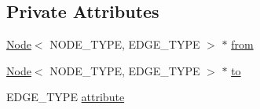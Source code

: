 \subsection*{Private Attributes}
\begin{DoxyCompactItemize}
\item 
\hyperlink{class_node}{Node}$<$ N\+O\+D\+E\+\_\+\+T\+Y\+P\+E, E\+D\+G\+E\+\_\+\+T\+Y\+P\+E $>$ $\ast$ \hyperlink{class_edge_a1bffa41df2941b7d55c59a5031f78e14}{from}
\item 
\hyperlink{class_node}{Node}$<$ N\+O\+D\+E\+\_\+\+T\+Y\+P\+E, E\+D\+G\+E\+\_\+\+T\+Y\+P\+E $>$ $\ast$ \hyperlink{class_edge_a7ba6dee1554e4a0a7cf69862e90fdd85}{to}
\item 
E\+D\+G\+E\+\_\+\+T\+Y\+P\+E \hyperlink{class_edge_ae49cc056dfa848b0a1beef821d81a31d}{attribute}
\end{DoxyCompactItemize}


